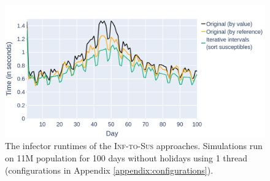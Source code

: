 \begin{figure}
    \centering
    \includegraphics[width=\linewidth]{4 - Sampling/fig/summary/infector_runtimes_summary_its.png}
    \caption{The infector runtimes of the \textsc{Inf-to-Sus} approaches. Simulations run on 11M population for 100 days without holidays using 1 thread (configurations in Appendix \ref{appendix:configurations}).}
    \label{fig:infector_runtimes_summary_its}
\end{figure}

